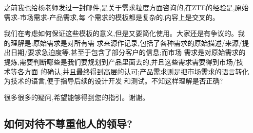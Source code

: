 \documentclass[11pt]{article}
\begin{document}
\begin{myquote}
之前我也给杨老师发过一封邮件,是关于需求粒度方面咨询的,在ZTE的经验是,原始需求-市场需求-产品需求,每
个需求的模板都是复杂的,内容上是交叉的。
\end{myquote}

\begin{comment}
这个情况非常不好。其实在这里开始改进非常有必要。请留意,我从来没有支持过``原始需求库''这个
  概念,因为这里``守株待兔''的味道太重了。

  如果大家都有了一定的抽取需求的水平,拿个原始需求库来存放,是可以的,但是意义不大,是一个次要的工具。
  我们在水平不够的情况,这个库就有如一个借口,一个依赖。这样就变成了毒草。
\end{comment}

\begin{myquote}
我们在考虑如何保证这些模板的意义,但是又要简化使用。大家还是有争议的。我的理解是:原始需求是对所有需
求来源作记录,包括了各种需求的原始描述/来源/提出日期/要求急迫度等,甚至于包含了部分客户的信息;而市场
需求是对原始需求的提炼,需要判断哪些是我们要规划到产品里面去的,并且这些需求需要得到市场/技术等各方面
的确认,并且最终得到高层的认可;产品需求则是把市场需求的语言转化为技术的语言,便于指导后续的设计开发
和测试。不知这样理解是否正确?
\end{myquote}

\begin{comment}
  需求,是跟着时间变得非常快的,是需要即时抽取的,是需要有前瞻性的,是需要有市场和产品根据的。放到库
  里的东西,不能存多久,否则没有意义。所以管理``原始需求''是浪费时间,没有意义的。对需求理念的错误理
  解,会导致发展系统工程的困难。这些模板如果复杂,就要改呀。还能做什么呢?

  客户(市场)需求,和产品需求的作用也讨论了很多。最近和这里的单位作了一、两个工作坊。我希望他们现在
  对这两种需求的分别的认识应该是清楚了很多吧。

  我愿意帮助大家理解这些事情,但我不明白为什么这些简单的东西这么困难。我猜是因为大家没有尝试过。如果
  尝试过,也可能是一遇到困难就停了,没有探讨下去。这样就使进步的障碍。我也没啥可说的。
\end{comment}

\begin{myquote}
 很多很多的疑问,希望能够得到您的指引。谢谢。
\end{myquote}

\begin{comment}
祝愿你成功。
\end{comment}

\subsection{如何对待不尊重他人的领导?}\label{link3}
\end{document}

